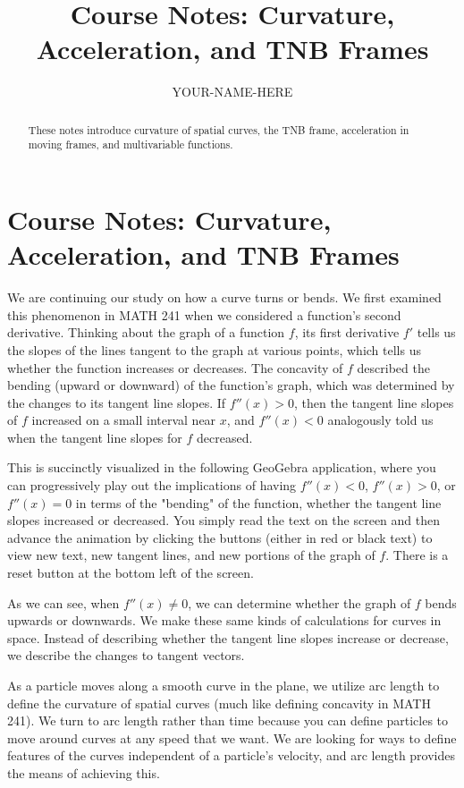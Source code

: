 \documentclass{ximera}
\title{Course Notes: Curvature, Acceleration, and TNB Frames}
\author{YOUR-NAME-HERE}
\begin{document}
\begin{abstract}
These notes introduce curvature of spatial curves, the TNB frame, acceleration in moving frames, and multivariable functions.
\end{abstract}
\maketitle

\section{Course Notes: Curvature, Acceleration, and TNB Frames}

We are continuing our study on how a curve turns or bends. We first examined this phenomenon in MATH 241 when we considered a function's second derivative. Thinking about the graph of a function $f$, its first derivative $f'$ tells us the slopes of the lines tangent to the graph at various points, which tells us whether the function increases or decreases. The concavity of $f$ described the bending (upward or downward) of the function's graph, which was determined by the changes to its tangent line slopes. If $f''(x)>0$, then the tangent line slopes of $f$ increased on a small interval near $x$, and $f''(x)<0$ analogously told us when the tangent line slopes for $f$ decreased.

This is succinctly visualized in the following GeoGebra application, where you can progressively play out the implications of having $f''(x)<0$, $f''(x)>0$, or $f''(x)=0$ in terms of the "bending" of the function, whether the tangent line slopes increased or decreased. You simply read the text on the screen and then advance the animation by clicking the buttons (either in red or black text) to view new text, new tangent lines, and new portions of the graph of $f$. There is a reset button at the bottom left of the screen.

\begin{center}
\end{center}

As we can see, when $f''(x)\neq 0$, we can determine whether the graph of $f$ bends upwards or downwards. We make these same kinds of calculations for curves in space. Instead of describing whether the tangent line slopes increase or decrease, we describe the changes to tangent vectors.

As a particle moves along a smooth curve in the plane, we utilize arc length to define the curvature of spatial curves (much like defining concavity in MATH 241). We turn to arc length rather than time because you can define particles to move around curves at any speed that we want. We are looking for ways to define features of the curves independent of a particle's velocity, and arc length provides the means of achieving this.
\end{document}
